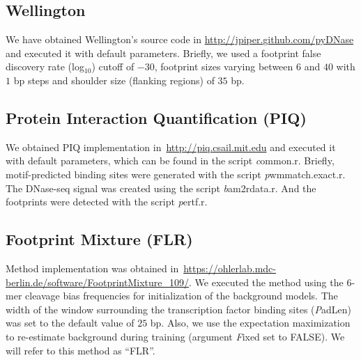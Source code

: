 \subsection{Wellington}
\label{sec:wellington}

We have obtained Wellington's source code in \url{http://jpiper.github.com/pyDNase} and executed it with default parameters. Briefly, we used a footprint false discovery rate (log$_{10}$) cutoff of $-30$, footprint sizes varying between $6$ and $40$ with $1$ bp steps and shoulder size (flanking regions) of $35$ bp.

\subsection{Protein Interaction Quantification (PIQ)}
\label{sec:piq}

We obtained PIQ implementation in~\url{http://piq.csail.mit.edu} and executed it with default parameters, which can be found in the script {\emph common.r}. Briefly, motif-predicted binding sites were generated with the script {\emph pwmmatch.exact.r}. The DNase-seq signal was created using the script {\emph bam2rdata.r}. And the footprints were detected with the script {\emph pertf.r}.

\subsection{Footprint Mixture (FLR)}
\label{sec:flr}

Method implementation was obtained in~\url{https://ohlerlab.mdc-berlin.de/software/FootprintMixture_109/}. We executed the method using the $6$-mer cleavage bias frequencies for initialization of the background models. The width of the window surrounding the transcription factor binding sites ({\emph PadLen}) was set to the default value of $25$ bp. Also, we use the expectation maximization to re-estimate background during training (argument {\emph Fixed} set to FALSE). We will refer to this method as ``FLR''.

